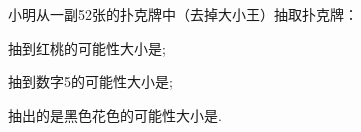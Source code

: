 小明从一副52张的扑克牌中（去掉大小王）抽取扑克牌：

\begin{subquestions}

    \subquestion 抽到红桃的可能性大小是\key{\hspace{1cm}};

    \subquestion 抽到数字5的可能性大小是\key{\hspace{1cm}};

    \subquestion 抽出的是黑色花色的可能性大小是\key{\hspace{1cm}}.

\end{subquestions}





